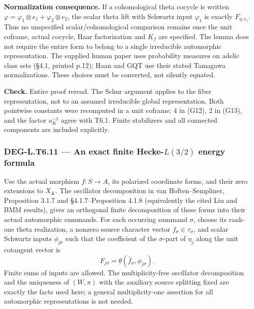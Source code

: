 \textbf{Normalization consequence.} If a cohomological theta cocycle is written \(\varphi=\varphi_1\otimes e_1+\varphi_2\otimes e_2\), the scalar theta lift with Schwartz input \(\varphi_1\) is exactly \(F_{\eta,e_1}\). Thus no unspecified scalar/cohomological comparison remains once the unit coframe, actual cocycle, Haar factorization and \(K_f\) are specified. The lemma does not require the entire form to belong to a single irreducible automorphic representation. The supplied human paper uses probability measures on adelic class sets (§4.1, printed p.12); Haan and GQT use their stated Tamagawa normalizations. These choices must be converted, not silently equated.

\textbf{Check.} Entire proof reread. The Schur argument applies to the fiber representation, not to an assumed irreducible global representation. Both pointwise constants were recomputed in a unit coframe; \(4\) in (G12), \(2\) in (G13), and the factor \(a_K^{-1}\) agree with T6.1. Finite stabilizers and all connected components are included explicitly.

\subsubsection{\texorpdfstring{DEG-L.T6.11 --- An exact finite Hecke-\(L(3/2)\) energy formula}{DEG-L.T6.11 --- An exact finite Hecke-L(3/2) energy formula}}\label{DEG-L.T6.11}

Use the actual morphism \(f:S\to A\), its polarized coordinate forms, and their zero extensions to \(X_K\). The oscillator decomposition in van Hoften--Sempliner, Proposition 3.1.7 and §4.1.7--Proposition 4.1.8 (equivalently the cited Liu and BMM results), gives an orthogonal finite decomposition of these forms into their actual automorphic summands. For each occurring summand \(\sigma\), choose its rank-one theta realization, a nonzero source character vector \(f_\sigma\in\tau_\sigma\), and scalar Schwartz inputs \(\phi_{j\sigma}\) such that the coefficient of the \(\sigma\)-part of \(\eta_j\) along the unit cotangent vector is \[
F_{j\sigma}=\theta(\bar f_\sigma,\phi_{j\sigma}).
\] Finite sums of inputs are allowed. The multiplicity-free oscillator decomposition and the uniqueness of \((W,\pi)\) with the auxiliary source splitting fixed are exactly the facts used here; a general multiplicity-one assertion for all automorphic representations is not needed.

